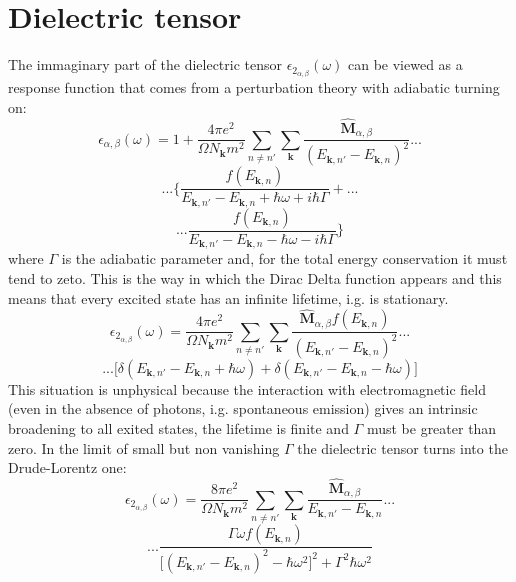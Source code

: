 \documentclass[twocolumn]{article}
\begin{document}
\section{Dielectric tensor}
The immaginary part of the dielectric tensor $\epsilon_{2_{\alpha,\beta}}(\omega)$ can be viewed as a response function
that comes from a perturbation theory with adiabatic turning on:
\begin{displaymath}
\epsilon_{\alpha,\beta}(\omega)=1+\frac{4 \pi e^2}{\Omega N_{\textbf{k}} m^2}\sum_{n\ne n'}\sum_{\textbf{k}}
\frac{\hat{\textbf{M}}_{\alpha,\beta}}{(E_{\textbf{k},n'}-E_{\textbf{k},n})^2}...
\end{displaymath}
\begin{displaymath}
...\Bigg\{\frac{f(E_{\textbf{k},n})}{E_{\textbf{k},n'}-E_{\textbf{k},n}+\hbar\omega+i\hbar\Gamma}+...
\end{displaymath}
\begin{equation}
...\frac{f(E_{\textbf{k},n})}{E_{\textbf{k},n'}-E_{\textbf{k},n}-\hbar\omega-i\hbar\Gamma}\Bigg\}
\end{equation}
where $\Gamma$ is the adiabatic parameter and, for the total energy conservation it must tend to zeto. This is the way in
which the Dirac Delta function appears and this means that every excited state has an infinite lifetime, i.g. is stationary.
\begin{displaymath}
\epsilon_{2_{\alpha,\beta}}(\omega)=\frac{4 \pi e^2}{\Omega N_{\textbf{k}} m^2}\sum_{n\ne n'}\sum_{\textbf{k}}
\frac{\hat{\textbf{M}}_{\alpha,\beta} f(E_{\textbf{k},n})}{(E_{\textbf{k},n'}-E_{\textbf{k},n})^2}...
\end{displaymath}
\begin{equation}
...\bigg[\delta(E_{\textbf{k},n'}-E_{\textbf{k},n}+\hbar\omega)+\delta(E_{\textbf{k},n'}-
E_{\textbf{k},n}-\hbar\omega)\bigg]
\end{equation}
This situation is unphysical because the interaction with
electromagnetic field (even in the absence of photons, i.g. spontaneous emission) gives an intrinsic broadening to all exited
states, the lifetime is finite and $\Gamma$ must be greater than zero. In the limit of small but non vanishing $\Gamma$
the dielectric tensor turns into the Drude-Lorentz one:
\begin{displaymath}
\epsilon_{2_{\alpha,\beta}}(\omega)=\frac{8 \pi e^2}{\Omega N_{\textbf{k}} m^2}\sum_{n\ne n'}\sum_{\textbf{k}}
\frac{\hat{\textbf{M}}_{\alpha,\beta}}{E_{\textbf{k},n'}-E_{\textbf{k},n}}...
\end{displaymath}
\begin{equation}
...\frac{\Gamma \omega f(E_{\textbf{k},n})}{\big[(E_{\textbf{k},n'}-E_{\textbf{k},n})^2-\hbar\omega^2\big]^2+\Gamma^2\hbar\omega^2}
\end{equation}
\end{document}
